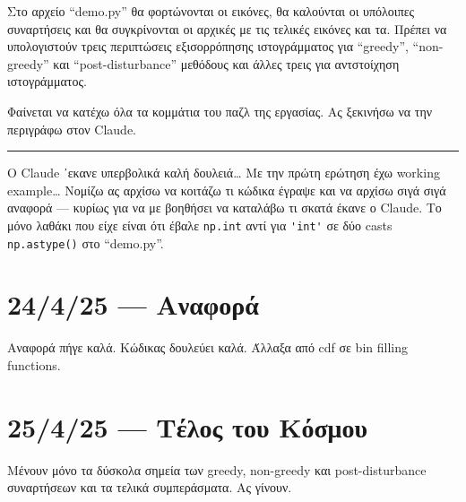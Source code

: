 \documentclass{article}
\begin{document}
Στο αρχείο ``demo.py'' θα φορτώνονται οι εικόνες, θα καλούνται οι υπόλοιπες
συναρτήσεις και θα συγκρίνονται οι αρχικές με τις τελικές εικόνες και τα. Πρέπει 
να υπολογιστούν τρεις περιπτώσεις εξισορρόπησης ιστογράμματος για 
``greedy'', ``non-greedy'' και ``post-disturbance'' μεθόδους και άλλες τρεις
για αντστοίχηση ιστογράμματος.

Φαίνεται να κατέχω όλα τα κομμάτια του παζλ της εργασίας. Ας ξεκινήσω να την 
περιγράφω στον Claude.

\vspace{1em}
\hrule
\vspace{1em}

Ο Claude ᾽εκανε υπερβολικά καλή δουλειά\ldots{} Με την πρώτη ερώτηση έχω 
working example\ldots{} Νομίζω ας αρχίσω να κοιτάζω τι κώδικα έγραψε και να 
αρχίσω σιγά σιγά αναφορά --- κυρίως για να με βοηθήσει να καταλάβω τι σκατά έκανε 
ο Claude. Το μόνο λαθάκι που είχε είναι ότι έβαλε \verb|np.int| αντί για 
\verb|'int'| σε δύο casts \verb|np.astype()| στο ``demo.py''.
\section{24/4/25 --- Αναφορά}
Αναφορά πήγε καλά. Κώδικας δουλεύει καλά. Άλλαξα από cdf σε bin filling
functions.

\section{25/4/25 --- Τέλος του Κόσμου}
Μένουν μόνο τα δύσκολα σημεία των greedy, non-greedy και post-disturbance 
συναρτήσεων και τα τελικά συμπεράσματα. Ας γίνουν.
\end{document}
